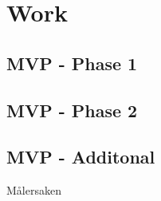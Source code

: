 \section{Work}



\subsection{MVP - Phase 1}


\subsection{MVP - Phase 2}


\subsection{MVP - Additonal}

Målersaken
